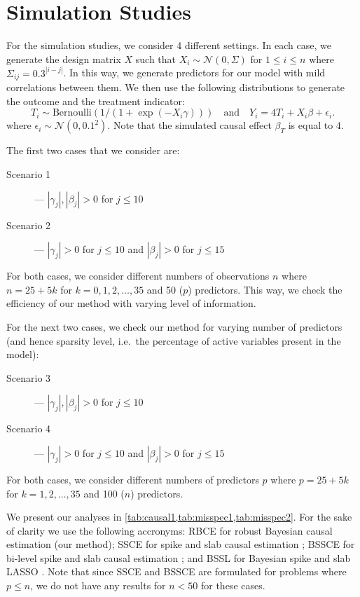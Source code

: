 \documentclass[preprint,12pt]{elsarticle}
\begin{document}
\section{Simulation Studies}\label{sec:sim}

For the simulation studies, we consider 4 different settings. In each
case, we generate the design matrix $X$ such that $X_i\sim\mathcal{N}(0, \Sigma)$
for $1\le i\le n$ where $\Sigma_{ij} = 0.3^{|i-j|}$. In this way, we 
generate predictors for our model with mild correlations between them.
We then use the following distributions to generate the outcome and
the treatment indicator: 
\begin{equation}
    T_i \sim \text{Bernoulli}\left(1/(1+\exp(-X_i\gamma))\right)
    \quad\text{and}\quad
    Y_i = 4T_i + X_i\beta + \epsilon_i.
\end{equation}
where $\epsilon_i\sim\mathcal{N}(0,0.1^2)$.
Note that the simulated causal effect $\beta_T$ is equal to $4$.

The first two cases that we consider are:
\begin{description}
    \item[Scenario 1] --- $|\gamma_j|, |\beta_j|>0$ for $j\le 10$
    \item[Scenario 2] --- $|\gamma_j|>0$ for $j\le 10$ and $|\beta_j|>0$ for $j\le 15$
\end{description}
For both
cases, we consider different numbers of observations $n$ where
$n=25+ 5k$ for $k=0,1,2,\dots,35$ and 50 ($p$)
predictors. This way, we check the efficiency of our method with varying level of information.

For the next two cases, we check our method for varying number of predictors (and hence sparsity level, i.e.\ the percentage of active variables present in the model):
\begin{description}
    \item[Scenario 3] --- $|\gamma_j|, |\beta_j|>0$ for $j\le 10$
    \item[Scenario 4] --- $|\gamma_j|>0$ for $j\le 10$ and $|\beta_j|>0$ for $j\le 15$
\end{description}
For both
cases, we consider different numbers of predictors $p$ where
$p=25+ 5k$ for $k=1,2,\dots,35$ and 100 ($n$)
predictors. 

We present our analyses in \cref{tab:causal1,tab:misspec1,tab:misspec2}.
For the sake of clarity we use the following accronyms: RBCE for 
robust Bayesian causal estimation (our method); SSCE for spike and
slab causal estimation \citep{koch2020}; BSSCE for bi-level spike and slab causal
estimation \citep{koch2020}; and BSSL for Bayesian spike and slab LASSO
\citep{xu2015}. Note that since SSCE and BSSCE are formulated for problems
where $p\le n$, we do not have any results for $n<50$ for these cases.
\end{document}
